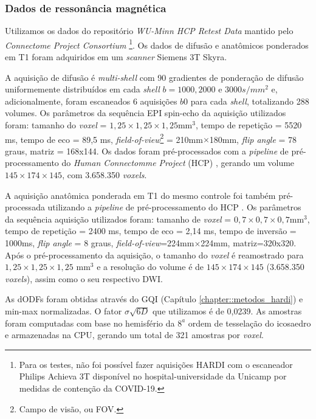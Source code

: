 \subsubsection{Dados de ressonância magnética}
\label{sssec::dados_de_ressonancia_magnetica}


Utilizamos os dados do repositório \textit{WU-Minn HCP Retest Data} mantido pelo \textit{Connectome Project Consortium} \cite{essen2012}\footnote{Para os testes, não foi possível fazer aquisições HARDI com o escaneador Philips Achieva 3T disponível no hospital-universidade da Unicamp por medidas de contenção da COVID-19.}.
Os dados de difusão e anatômicos ponderados em T1 foram adquiridos em um \textit{scanner} Siemens 3T Skyra.

A aquisição de difusão é \textit{multi-shell} com 90 gradientes de ponderação de difusão uniformemente distribuídos em cada \textit{shell} $b = 1000, 2000$ e $3000 s/mm^2$ e, adicionalmente, foram escaneados 6 aquisições $b0$ para cada \textit{shell}, totalizando 288 volumes. Os parâmetros da sequência EPI spin-echo da aquisição utilizados foram: tamanho do \textit{voxel} = $1,25\times 1,25 \times 1,25$mm$^3$, tempo de repetição = 5520 ms, tempo de eco = 89,5 ms, \textit{field-of-view}\footnote{Campo de visão, ou FOV.} = 210mm$\times$180mm, \textit{flip angle} = 78 graus, matriz = 168x144. Os dados foram pré-processados com a \textit{pipeline} de pré-processamento do \textit{Human Connectomme Project} (HCP) \cite{glasser2013}, gerando um volume $145\times 174\times  145$, com 3.658.350 \textit{voxels}.

A aquisição anatômica ponderada em T1 do mesmo controle foi também pré-processada utilizando a \textit{pipeline} de pré-processamento do HCP \cite{glasser2013}. Os parâmetros da sequência aquisição utilizados foram: tamanho de \textit{voxel} = $0,7\times 0,7 \times 0,7$mm$^3$, tempo de repetição = 2400 ms, tempo de eco = 2,14 ms, tempo de inversão = 1000ms, \textit{flip angle} = 8 graus, \textit{field-of-view}=224mm$\times$224mm, matriz=320x320. Após o pré-processamento da aquisição, o tamanho do \textit{voxel} é reamostrado para $1,25\times 1,25 \times 1,25$ mm$^3$ e a resolução do volume é de $145\times 174\times 145$ (3.658.350 \textit{voxels}), assim como o seu respectivo DWI.

As dODFs foram obtidas através do GQI \cite{yeh2010} (Capítulo \ref{chapter::metodos_hardi}) e min-max normalizadas. O fator $\sigma \sqrt{6D}$ que utilizamos é de 0,0239. As amostras foram computadas com base no hemisfério da $8^{a}$ ordem de tesselação do icosaedro e armazenadas na CPU, gerando um total de 321 amostras por \textit{voxel}.

